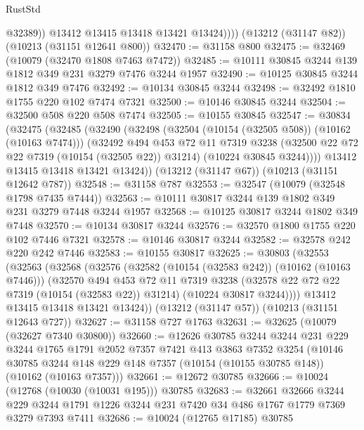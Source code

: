 \begin{lexlean}{RustStd}
\begin{coremodule}
                @32389))
            @13412
            @13415
            @13418
            @13421
            @13424))))
    (@13212 (@31147 @82))
    (@10213 (@31151 @12641 @800))
@32470 := @31158 @800
@32475 := @32469 (@10079 (@32470 @1808 @7463 @7472))
@32485 := @10111 @30845 @3244 @139 @1812 @349 @231 @3279 @7476 @3244 @1957
@32490 := @10125 @30845 @3244 @1812 @349 @7476
@32492 := @10134 @30845 @3244
@32498 := @32492 @1810 @1755 @220 @102 @7474 @7321
@32500 := @10146 @30845 @3244
@32504 := @32500 @508 @220 @508 @7474
@32505 := @10155 @30845
@32547 := @30834
    (@32475
      (@32485
        (@32490
          (@32498
            (@32504 (@10154 (@32505 @508)) (@10162 (@10163 @7474)))
            (@32492
              @494
              @453
              @72
              @11
              @7319
              @3238
              (@32500 @22 @72 @22 @7319 (@10154 (@32505 @22)) @31214)
              (@10224 @30845 @3244))))
        @13412
        @13415
        @13418
        @13421
        @13424))
    (@13212 (@31147 @67))
    (@10213 (@31151 @12642 @787))
@32548 := @31158 @787
@32553 := @32547 (@10079 (@32548 @1798 @7435 @7444))
@32563 := @10111 @30817 @3244 @139 @1802 @349 @231 @3279 @7448 @3244 @1957
@32568 := @10125 @30817 @3244 @1802 @349 @7448
@32570 := @10134 @30817 @3244
@32576 := @32570 @1800 @1755 @220 @102 @7446 @7321
@32578 := @10146 @30817 @3244
@32582 := @32578 @242 @220 @242 @7446
@32583 := @10155 @30817
@32625 := @30803
    (@32553
      (@32563
        (@32568
          (@32576
            (@32582 (@10154 (@32583 @242)) (@10162 (@10163 @7446)))
            (@32570
              @494
              @453
              @72
              @11
              @7319
              @3238
              (@32578 @22 @72 @22 @7319 (@10154 (@32583 @22)) @31214)
              (@10224 @30817 @3244))))
        @13412
        @13415
        @13418
        @13421
        @13424))
    (@13212 (@31147 @57))
    (@10213 (@31151 @12643 @727))
@32627 := @31158 @727 @1763
@32631 := @32625 (@10079 (@32627 @7340 @30800))
@32660 := @12626
    @30785
    @3244
    @3244
    @231
    @229
    @3244
    @1765
    @1791
    @2052
    @7357
    @7421
    @413
    @3863
    @7352
    @3254
    (@10146 @30785 @3244 @148 @229 @148 @7357 (@10154 (@10155 @30785 @148)) (@10162 (@10163 @7357)))
@32661 := @12672 @30785
@32666 := @10024 (@12768 (@10030 (@10031 @195))) @30785
@32683 := @32661
    @32666
    @3244
    @229
    @3244
    @1791
    @1226
    @3244
    @231
    @7420
    @34
    @486
    @1767
    @1779
    @7369
    @3279
    @7393
    @7411
@32686 := @10024 (@12765 @17185) @30785

\end{coremodule}
\end{lexlean}
